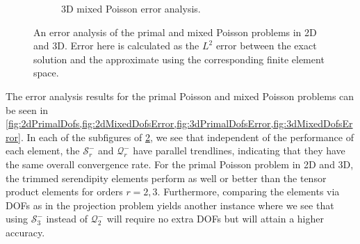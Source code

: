 \documentclass[format=acmsmall,screen,timestamp=false,a4paper]{acmart}
\begin{document}
\begin{figure}[htbp]
\begin{subfigure}[h]{0.48\textwidth}
      \caption{3D mixed Poisson error analysis. \label{fig:3dMixedDofsError}}
  \end{subfigure}
  \caption{An error analysis of the primal and mixed Poisson problems in 2D and 3D.  Error here is calculated as the $L^2$ error between the exact solution and the approximate using the corresponding finite element space.}
\label{fig:PrimalMixedErrorAnalysis}
\end{figure}


The error analysis results for the primal Poisson and mixed Poisson problems can be seen in \cref{fig:2dPrimalDofs,fig:2dMixedDofsError,fig:3dPrimalDofsError,fig:3dMixedDofsError}.  In each of the subfigures of \cref{fig:PrimalMixedErrorAnalysis}, we see that independent of the performance of each element, the $\mathcal{S}^-_r$ and $\mathcal{Q}^-_r$ have parallel trendlines, indicating that they have the same overall convergence rate.  For the primal Poisson problem in 2D and 3D, the trimmed serendipity elements perform as well or better than the tensor product elements for orders $r=2,3$.  Furthermore, comparing the elements via DOFs as in the projection problem yields another instance where we see that using $\mathcal{S}^-_{3}$ instead of $\mathcal{Q}^-_2$ will require no extra DOFs but will attain a higher accuracy.  


\end{document}
